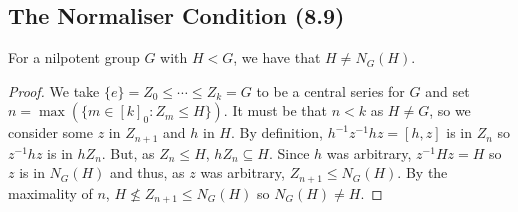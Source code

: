 \subsection{The Normaliser Condition (8.9)} \label{8.9}

For a nilpotent group $G$ with $H < G$, we have that $H \neq N_G(H)$.

\begin{proof}
    We take $\{e\} = Z_0 \leq \cdots \leq Z_k = G$ to be a central
    series for $G$ and set $n = \max(\{m \in [k]_0 : Z_m \leq H\})$.
    It must be that $n < k$ as $H \neq G$, so we consider some
    $z$ in $Z_{n + 1}$ and $h$ in $H$. By definition, 
    $h^{-1}z^{-1}hz = [h, z]$ is in $Z_n$ so 
    $z^{-1}hz$ is in $hZ_n$. But, as $Z_n \leq H$, $hZ_n \subseteq H$.
    Since $h$ was arbitrary, $z^{-1}Hz = H$ so $z$ is in $N_G(H)$
    and thus, as $z$ was arbitrary, $Z_{n + 1} \leq N_G(H)$. 
    By the maximality of $n$, $H \nleq Z_{n + 1} \leq N_G(H)$
    so $N_G(H) \neq H$.
\end{proof}
